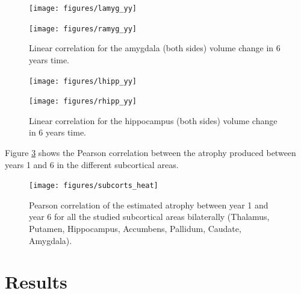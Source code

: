 \documentclass[11pt]{article}
\theoremstyle{definition}
\theoremstyle{remark}
\begin{document}
\begin{figure}[!htb]
    \centering
    \begin{minipage}{.45\textwidth}
        \centering
        \texttt{[image: figures/lamyg\_yy]} %
    \end{minipage}%
    \hfill
    \begin{minipage}{0.45\textwidth}
        \centering
        \texttt{[image: figures/ramyg\_yy]}
    \end{minipage}
    \caption{Linear correlation for the amygdala (both sides) volume change in 6 years time.}
    \label{fig:amygyy}
\end{figure}

\begin{figure}[!htb]
    \centering
    \begin{minipage}{.45\textwidth}
        \centering
        \texttt{[image: figures/lhipp\_yy]} %
    \end{minipage}%
    \hfill
    \begin{minipage}{0.45\textwidth}
        \centering
        \texttt{[image: figures/rhipp\_yy]}
    \end{minipage}
    \caption{Linear correlation for the hippocampus (both sides) volume change in 6 years time.}
    \label{fig:hippyy}
\end{figure}

\newpage
Figure \ref{fig:subyypearson} shows the Pearson correlation between the atrophy produced between years 1 and 6 in the different subcortical areas. 
\begin{figure}[!htb]
        \centering
        \texttt{[image: figures/subcorts\_heat]}
        \caption{Pearson correlation of the estimated atrophy between year 1 and year 6 for all the studied subcortical areas bilaterally (Thalamus, Putamen, Hippocampus, Accumbens, Pallidum, Caudate, Amygdala).} 
        \label{fig:subyypearson}
\end{figure}

\newpage
\section{Results}
\label{se:res}
\end{document}
